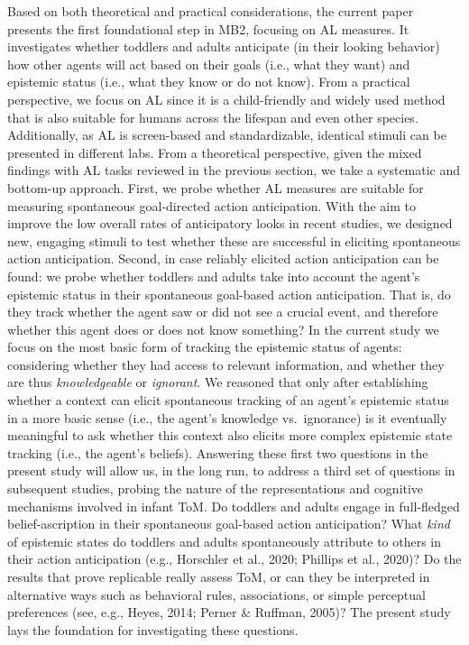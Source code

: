 \documentclass[
  english,
  man,floatsintext]{apa6}
\begin{document}
Based on both theoretical and practical considerations, the current paper presents the first foundational step in MB2, focusing on AL measures. It investigates whether toddlers and adults anticipate (in their looking behavior) how other agents will act based on their goals (i.e., what they want) and epistemic status (i.e., what they know or do not know). From a practical perspective, we focus on AL since it is a child-friendly and widely used method that is also suitable for humans across the lifespan and even other species. Additionally, as AL is screen-based and standardizable, identical stimuli can be presented in different labs. From a theoretical perspective, given the mixed findings with AL tasks reviewed in the previous section, we take a systematic and bottom-up approach.
First, we probe whether AL measures are suitable for measuring spontaneous goal-directed action anticipation. With the aim to improve the low overall rates of anticipatory looks in recent studies, we designed new, engaging stimuli to test whether these are successful in eliciting spontaneous action anticipation. Second, in case reliably elicited action anticipation can be found: we probe whether toddlers and adults take into account the agent's epistemic status in their spontaneous goal-based action anticipation. That is, do they track whether the agent saw or did not see a crucial event, and therefore whether this agent does or does not know something? In the current study we focus on the most basic form of tracking the epistemic status of agents: considering whether they had access to relevant information, and whether they are thus \emph{knowledgeable} or \emph{ignorant}. We reasoned that only after establishing whether a context can elicit spontaneous tracking of an agent's epistemic status in a more basic sense (i.e., the agent's knowledge vs.~ignorance) is it eventually meaningful to ask whether this context also elicits more complex epistemic state tracking (i.e., the agent's beliefs).
Answering these first two questions in the present study will allow us, in the long run, to address a third set of questions in subsequent studies, probing the nature of the representations and cognitive mechanisms involved in infant ToM. Do toddlers and adults engage in full-fledged belief-ascription in their spontaneous goal-based action anticipation? What \emph{kind} of epistemic states do toddlers and adults spontaneously attribute to others in their action anticipation (e.g., Horschler et al., 2020; Phillips et al., 2020)? Do the results that prove replicable really assess ToM, or can they be interpreted in alternative ways such as behavioral rules, associations, or simple perceptual preferences (see, e.g., Heyes, 2014; Perner \& Ruffman, 2005)? The present study lays the foundation for investigating these questions.
\end{document}
